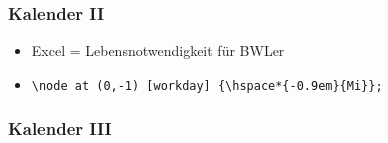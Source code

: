 \documentclass[14pt,ngerman]{beamer}
\begin{document}
\begin{frame}[containsverbatim]
\frametitle{Kalender II}

\begin{itemize}
	\item Excel = Lebensnotwendigkeit für BWLer
	\item \lstinline|\node at (0,-1) [workday] {\hspace*{-0.9em}{Mi}};|
\end{itemize}\vspace*{-0.5cm}

\begin{center}
\end{center}
\end{frame}


\begin{frame}[containsverbatim]
\frametitle{Kalender III}

\begin{center}
\end{center}
\end{frame}
\end{document}
